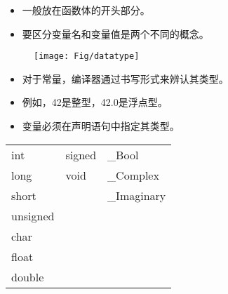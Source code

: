 \begin{frame}
\begin{itemize}
\item
一般放在函数体的开头部分。\\[0.1in]
\item
要区分变量名和变量值是两个不同的概念。
\end{itemize}

\begin{figure}
\centering
{}
\end{figure}

\end{frame}


\begin{frame}
\begin{figure}
\texttt{[image: Fig/datatype]}
\end{figure}
\end{frame}


\begin{frame}
\begin{itemize}
\item 
对于常量，编译器通过书写形式来辨认其类型。\\[0.1in]
\item[] 例如，42是整型，42.0是浮点型。\\[0.2in]
\item
变量必须在声明语句中指定其类型。
\end{itemize}
\end{frame}

\begin{frame}
\begin{table}
\centering
\begin{tabular}{p{2cm}|p{2cm}|p{2cm}}\hline
int & signed & \_Bool \\[0.05in]
long & void & \_Complex \\[0.05in]
short & & \_Imaginary\\[0.05in]
unsigned &&\\[0.05in]
char &&\\[0.05in]
float &&\\[0.05in]
double &&\\\hline
\end{tabular}
\end{table}
\end{frame}

